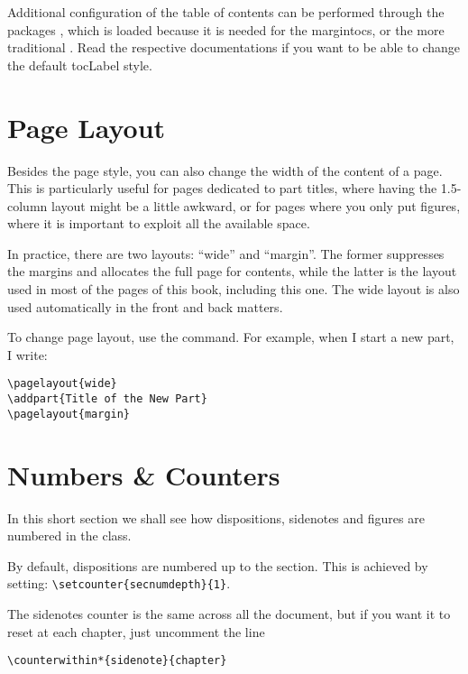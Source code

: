 Additional configuration of the table of contents can be performed 
through the packages , which is loaded because it is 
needed for the margintocs, or the more traditional . 
Read the respective documentations if you want to be able to change the 
default \acrshort{tocLabel} style.

\section{Page Layout}

Besides the page style, you can also change the width of the content of 
a page. This is particularly useful for pages dedicated to part titles, 
where having the 1.5-column layout might be a little awkward, or for 
pages where you only put figures, where it is important to exploit all 
the available space.

In practice, there are two layouts: \enquote{wide} and \enquote{margin}. 
The former suppresses the margins and allocates the full page for 
contents, while the latter is the layout used in most of the pages of 
this book, including this one. The wide layout is also used 
automatically in the front and back matters.

To change page layout, use the  command. For 
example, when I start a new part, I write:

\begin{lstlisting}
\pagelayout{wide}
\addpart{Title of the New Part}
\pagelayout{margin}
\end{lstlisting}

\section{Numbers \& Counters}

In this short section we shall see how dispositions, sidenotes and 
figures are numbered in the  class.

By default, dispositions are numbered up to the section. This is 
achieved by setting: \lstinline|\setcounter{secnumdepth}{1}|.

The sidenotes counter is the same across all the document, but if you 
want it to reset at each chapter, just uncomment the line

\begin{lstlisting}[style=kaolstplain]
\counterwithin*{sidenote}{chapter}
\end{lstlisting}

